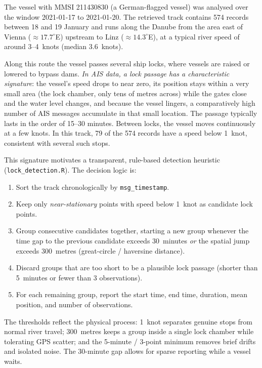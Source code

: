 \documentclass[10pt,a4paper]{article}
\begin{document}
The vessel with MMSI 211430830 (a German-flagged vessel) was analysed over the window
2021-01-17 to 2021-01-20. The retrieved track contains 574 records between 18 and 19
January and runs along the Danube from the area east of Vienna
($\approx 17.7^\circ$E) upstream to Linz ($\approx 14.3^\circ$E), at a typical river
speed of around 3--4~knots (median 3.6~knots).

Along this route the vessel passes several ship locks, where vessels are raised or
lowered to bypass dams. \emph{In AIS data, a lock passage has a characteristic
signature}: the vessel's speed drops to near zero, its position stays within a very
small area (the lock chamber, only tens of metres across) while the gates close and the
water level changes, and because the vessel lingers, a comparatively high number of AIS
messages accumulate in that small location. The passage typically lasts in the order of
15--30 minutes. Between locks, the vessel moves continuously at a few knots. In this
track, 79 of the 574 records have a speed below 1~knot, consistent with several such
stops.

This signature motivates a transparent, rule-based detection heuristic
(\texttt{lock\_detection.R}). The decision logic is:
\begin{enumerate}
    \item Sort the track chronologically by \texttt{msg\_timestamp}.
    \item Keep only \emph{near-stationary} points with speed below 1~knot as
          candidate lock points.
    \item Group consecutive candidates together, starting a new group whenever the
          time gap to the previous candidate exceeds 30~minutes \emph{or} the spatial
          jump exceeds 300~metres (great-circle / haversine distance).
    \item Discard groups that are too short to be a plausible lock passage (shorter
          than 5~minutes or fewer than 3 observations).
    \item For each remaining group, report the start time, end time, duration,
          mean position, and number of observations.
\end{enumerate}
The thresholds reflect the physical process: 1~knot separates genuine stops from
normal river travel; 300~metres keeps a group inside a single lock chamber while
tolerating GPS scatter; and the 5-minute / 3-point minimum removes brief drifts and
isolated noise. The 30-minute gap allows for sparse reporting while a vessel waits.
\end{document}
